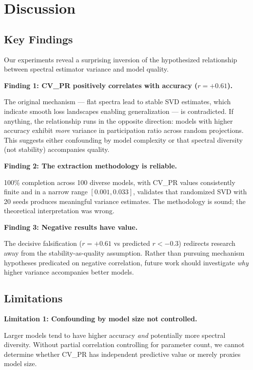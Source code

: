 \section{Discussion}
\label{sec:discussion}

\subsection{Key Findings}

Our experiments reveal a surprising inversion of the hypothesized relationship between spectral estimator variance and model quality.

\textbf{Finding 1: CV\_PR positively correlates with accuracy ($r = +0.61$).}

The original mechanism --- flat spectra lead to stable SVD estimates, which indicate smooth loss landscapes enabling generalization --- is contradicted. If anything, the relationship runs in the opposite direction: models with higher accuracy exhibit \emph{more} variance in participation ratio across random projections. This suggests either confounding by model complexity or that spectral diversity (not stability) accompanies quality.

\textbf{Finding 2: The extraction methodology is reliable.}

100\% completion across 100 diverse models, with CV\_PR values consistently finite and in a narrow range $[0.001, 0.033]$, validates that randomized SVD with 20 seeds produces meaningful variance estimates. The methodology is sound; the theoretical interpretation was wrong.

\textbf{Finding 3: Negative results have value.}

The decisive falsification ($r = +0.61$ vs predicted $r < -0.3$) redirects research away from the stability-as-quality assumption. Rather than pursuing mechanism hypotheses predicated on negative correlation, future work should investigate \emph{why} higher variance accompanies better models.

\subsection{Limitations}

\textbf{Limitation 1: Confounding by model size not controlled.}

Larger models tend to have higher accuracy \emph{and} potentially more spectral diversity. Without partial correlation controlling for parameter count, we cannot determine whether CV\_PR has independent predictive value or merely proxies model size.


